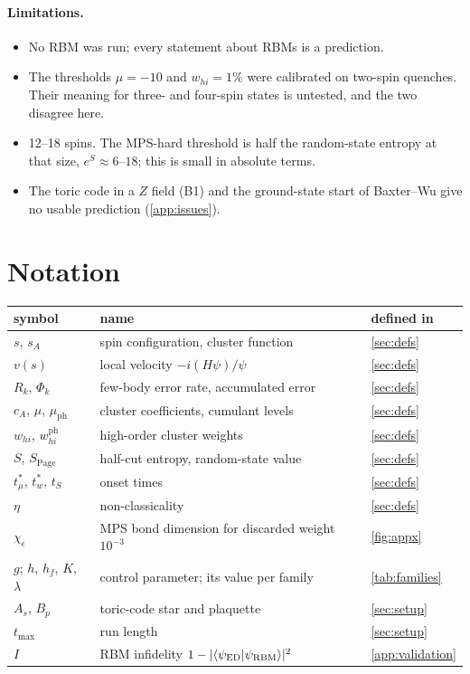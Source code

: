 \documentclass[11pt,a4paper]{article}
\newcommand{\tmu}{t^*_\mu}
\newcommand{\tw}{t^*_w}
\newcommand{\whi}{w_{hi}}
\newcommand{\Spage}{S_{\mathrm{Page}}}
\begin{document}
\paragraph{Limitations.}
\begin{itemize}
  \item No RBM was run; every statement about RBMs is a prediction.
  \item The thresholds $\mu=-10$ and $\whi=1\%$ were calibrated on two-spin quenches. Their meaning for three- and
    four-spin states is untested, and the two disagree here.
  \item 12--18 spins. The MPS-hard threshold is half the random-state entropy at that size, $e^S\approx6$--$18$; this
    is small in absolute terms.
  \item The toric code in a $Z$ field (B1) and the ground-state start of Baxter--Wu give no usable prediction
    (\cref{app:issues}).
\end{itemize}

\FloatBarrier
\appendix

\section{Notation}
\begin{center}
\begin{tabular}{lll}
  \toprule
  symbol & name & defined in \\
  \midrule
  $s$, $s_A$ & spin configuration, cluster function & \cref{sec:defs} \\
  $v(s)$ & local velocity $-i(H\psi)/\psi$ & \cref{sec:defs} \\
  $R_k$, $\Phi_k$ & few-body error rate, accumulated error & \cref{sec:defs} \\
  $c_A$, $\mu$, $\mu_{\mathrm{ph}}$ & cluster coefficients, cumulant levels & \cref{sec:defs} \\
  $\whi$, $\whi^{\mathrm{ph}}$ & high-order cluster weights & \cref{sec:defs} \\
  $S$, $\Spage$ & half-cut entropy, random-state value & \cref{sec:defs} \\
  $\tmu$, $\tw$, $t_S$ & onset times & \cref{sec:defs} \\
  $\eta$ & non-classicality & \cref{sec:defs} \\
  $\chi_\epsilon$ & MPS bond dimension for discarded weight $10^{-3}$ & \cref{fig:appx} \\
  $g$; $h$, $h_f$, $K$, $\lambda$ & control parameter; its value per family & \cref{tab:families} \\
  $A_s$, $B_p$ & toric-code star and plaquette & \cref{sec:setup} \\
  $t_{\max}$ & run length & \cref{sec:setup} \\
  $I$ & RBM infidelity $1-\lvert\braket{\psi_{\mathrm{ED}}|\psi_{\mathrm{RBM}}}\rvert^2$ & \cref{app:validation} \\
  \bottomrule
\end{tabular}
\end{center}
\end{document}
